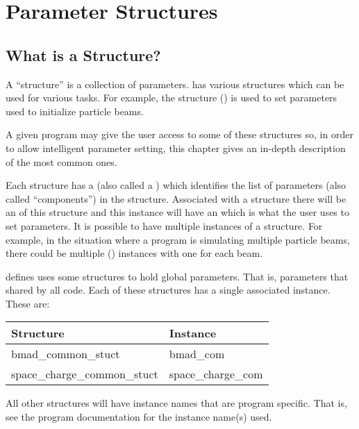 \chapter{Parameter Structures}
\label{c:param.structs}

\section{What is a Structure?}
\label{s:struct}

A ``structure'' is a collection of parameters.  \bmad has various structures which can be used for
various tasks. For example, the  structure () is used
to set parameters used to initialize particle beams.

A given program may give the user access to some of these structures so, in order to allow
intelligent parameter setting, this chapter gives an in-depth description of the most common ones.

Each structure has a  (also called a ) which identifies the
list of parameters (also called ``components'') in the structure. Associated with a structure there
will be an  of this structure and this instance will have an 
which is what the user uses to set parameters. It is possible to have multiple instances of a
structure. For example, in the situation where a program is simulating multiple particle beams,
there could be multiple  () instances with one for
each beam.

\bmad defines uses some structures to hold global parameters. That is, parameters that shared by all
code. Each of these structures has a single associated instance. These are:
\begin{center}
  \begin{tabular}{ll} \toprule
  Structure                 & Instance         \\
  \midrule
  bmad_common_stuct         & bmad_com         \\
  space_charge_common_stuct & space_charge_com \\
  \bottomrule
  \end{tabular}
\end{center}
All other structures will have instance names that are program specific. That is, see the program
documentation for the instance name(s) used.

